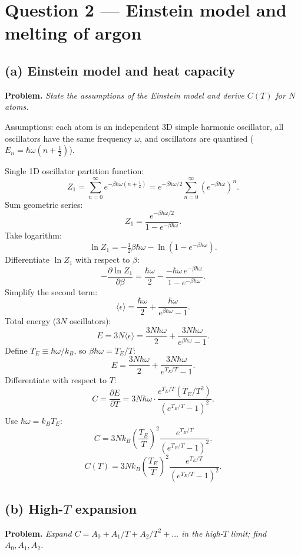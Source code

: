 \documentclass[11pt]{article}
\newcommand{\pd}[2]{\frac{\partial #1}{\partial #2}}
\begin{document}
\section*{Question 2 --- Einstein model and melting of argon}

\subsection*{(a) Einstein model and heat capacity}

\textbf{Problem.} \emph{State the assumptions of the Einstein model and derive $C(T)$ for $N$ atoms.}

Assumptions: each atom is an independent 3D simple harmonic oscillator, all oscillators have the same frequency $\omega$, and oscillators are quantised ($E_n=\hbar\omega(n+\tfrac12)$).

Single 1D oscillator partition function:
\[
Z_1 = \sum_{n=0}^{\infty} e^{-\beta\hbar\omega(n+\tfrac12)} = e^{-\beta\hbar\omega/2}\sum_{n=0}^{\infty}(e^{-\beta\hbar\omega})^n.
\]
Sum geometric series:
\[
Z_1 = \frac{e^{-\beta\hbar\omega/2}}{1-e^{-\beta\hbar\omega}}.
\]
Take logarithm:
\[
\ln Z_1 = -\tfrac12 \beta\hbar\omega - \ln(1-e^{-\beta\hbar\omega}).
\]
Differentiate $\ln Z_1$ with respect to $\beta$:
\[
-\pd{\ln Z_1}{\beta} = \frac{\hbar\omega}{2} - \frac{-\hbar\omega\,e^{-\beta\hbar\omega}}{1-e^{-\beta\hbar\omega}}.
\]
Simplify the second term:
\[
\langle\epsilon\rangle = \frac{\hbar\omega}{2} + \frac{\hbar\omega}{e^{\beta\hbar\omega}-1}.
\]
Total energy ($3N$ oscillators):
\[
E = 3N\langle\epsilon\rangle = \frac{3N\hbar\omega}{2} + \frac{3N\hbar\omega}{e^{\beta\hbar\omega}-1}.
\]
Define $T_E\equiv\hbar\omega/k_B$, so $\beta\hbar\omega = T_E/T$:
\[
E = \frac{3N\hbar\omega}{2} + \frac{3N\hbar\omega}{e^{T_E/T}-1}.
\]
Differentiate with respect to $T$:
\[
C = \pd{E}{T} = 3N\hbar\omega \cdot \frac{e^{T_E/T}(T_E/T^2)}{(e^{T_E/T}-1)^2}.
\]
Use $\hbar\omega = k_B T_E$:
\[
C = 3Nk_B\left(\frac{T_E}{T}\right)^{\!2}\frac{e^{T_E/T}}{(e^{T_E/T}-1)^2}.
\]
\[
\boxed{\;C(T) = 3Nk_B\left(\frac{T_E}{T}\right)^{\!2}\frac{e^{T_E/T}}{(e^{T_E/T}-1)^2}.\;}
\]

\subsection*{(b) High-$T$ expansion}

\textbf{Problem.} \emph{Expand $C=A_0+A_1/T+A_2/T^2+\dots$ in the high-$T$ limit; find $A_0,A_1,A_2$.}
\end{document}
